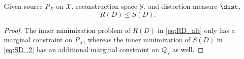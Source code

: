 \documentclass[11pt]{article}
\begin{document}
	    
	    \begin{proposition}
	    \label{prop:SD_UB}
	    Given source $P_X$ on $\mathcal{X}$, reconstruction space $\mathcal{Y}$, and distortion measure $\dist$,  
	    \begin{equation}
	        R(D) \leq S(D).
	        \label{eq:RD-Sinkhorn}
	    \end{equation}
	    \end{proposition}
	   \begin{proof}
            The inner minimization problem of $R(D)$ in \eqref{eq:RD_alt} only has a marginal constraint on $P_X$, whereas the inner minimization of $S(D)$ in  \eqref{eq:SD_2} has an additional marginal constraint on $Q_Y$ as well.
    	\end{proof}
        
        

    	
    	
     
\end{document}
